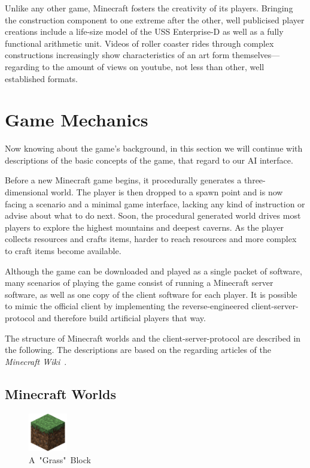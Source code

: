Unlike any other game, Minecraft fosters the creativity of its players. Bringing the construction component to one extreme after the other, well publicised player creations include a life-size model of the USS Enterprise-D as well as a fully functional arithmetic unit. Videos of roller coaster rides through complex constructions increasingly show characteristics of an art form themselves---regarding to the amount of views on youtube, not less than other, well established formats.

    \section{Game Mechanics}
Now knowing about the game's background, in this section we will continue with descriptions of the basic concepts of the game, that regard to our AI interface. 

Before a new Minecraft game begins, it procedurally generates a three-dimensional world. The player is then dropped to a spawn point and is now facing a scenario and a minimal game interface, lacking any kind of instruction or advise about what to do next. Soon, the procedural generated world drives most players to explore the highest mountains and deepest caverns. As the player collects resources and crafts items, harder to reach resources and more complex to craft items  become available.~\cite{Duncan:2011:MBC:2207096.2207097}

Although the game can be downloaded and played as a single packet of software, many scenarios of playing the game consist of running a Minecraft server software, as well as one copy of the client software for each player. It is possible to mimic the official client by implementing the reverse-engineered client-server-protocol and therefore build artificial players that way.

The structure of Minecraft worlds and the client-server-protocol are described in the following. The descriptions are based on the regarding articles of the \emph{Minecraft Wiki}~\cite{mcwiki}.

    \subsection{Minecraft Worlds}

\begin{figure}
  \begin{center}
    \includegraphics[width=0.15\textwidth]{graphics/block}
  \end{center}
  \caption{A~"Grass"~Block~\cite{image_mob}}
  \label{mc_block}
\end{figure}


